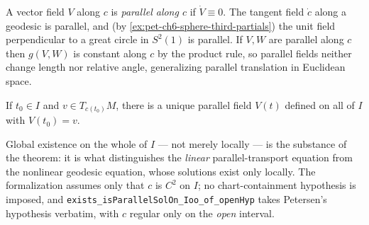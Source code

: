 \begin{definition}
  \label{def:pet-ch6-parallel-field}
  \leanok
  A vector field $V$ along $c$ is \emph{parallel along $c$} if $\dot V\equiv0$.
  The tangent field $\dot c$ along a geodesic is parallel, and (by
  \cref{ex:pet-ch6-sphere-third-partials}) the unit field perpendicular to a
  great circle in $S^2(1)$ is parallel. If $V,W$ are parallel along $c$ then
  $g(V,W)$ is constant along $c$ by the product rule, so parallel fields neither
  change length nor relative angle, generalizing parallel translation in
  Euclidean space.
\end{definition}

\begin{theorem}
  \label{thm:pet-ch6-parallel-field-existence-uniqueness}
  \leanok
  If $t_0\in I$ and $v\in T_{c(t_0)}M$, there is a unique parallel field $V(t)$
  defined on all of $I$ with $V(t_0)=v$.

  Global existence on the whole of $I$ — not merely locally — is the substance of
  the theorem: it is what distinguishes the \emph{linear} parallel-transport
  equation from the nonlinear geodesic equation, whose solutions exist only
  locally. The formalization assumes only that $c$ is $C^2$ on $I$; no
  chart-containment hypothesis is imposed, and
  \texttt{exists\_isParallelSolOn\_Ioo\_of\_openHyp} takes Petersen's hypothesis
  verbatim, with $c$ regular only on the \emph{open} interval.
\end{theorem}
